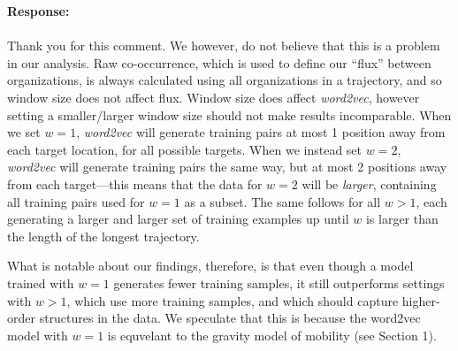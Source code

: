 \documentclass[12pt,a4paper]{article}
\newcommand{\response}[1]{{\noindent \textbf{Response:} \\ \\ \noindent #1}}
\begin{document}
\response{
	Thank you for this comment.
	We however, do not believe that this is a problem in our analysis.
	Raw co-occurrence, which is used to define our ``flux'' between organizations, is always calculated using all organizations in a trajectory, and so window size does not affect flux.
	Window size does affect \textit{word2vec}, however setting a smaller/larger window size should not make results incomparable.
	When we set $w = 1$, \textit{word2vec} will generate training pairs at most 1 position away from each target location, for all possible targets.
	When we instead set $w = 2$, \textit{word2vec} will generate training pairs the same way, but at most 2 positions away from each target---this means that the data for $w = 2$ will be \textit{larger}, containing all training pairs used for $w = 1$ as a subset.
	The same follows for all $w > 1$, each generating a larger and larger set of training examples up until $w$ is larger than the length of the longest trajectory.

	What is notable about our findings, therefore, is that even though a model trained with $w = 1$ generates fewer training samples, it still outperforms settings with $w > 1$, which use more training samples, and which should capture higher-order structures in the data.
	We speculate that this is because the word2vec model with $w = 1$ is equvelant to the gravity model of mobility (see Section 1).
}
\end{document}
